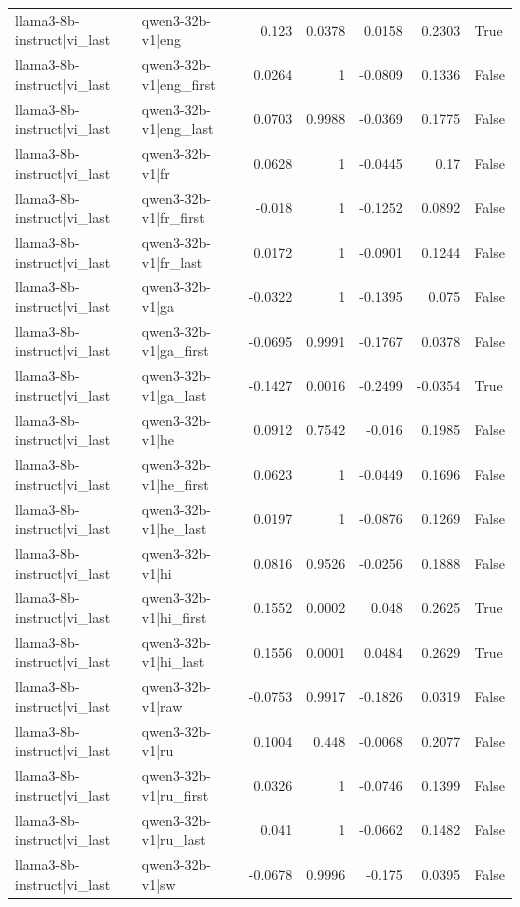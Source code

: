 \begin{table}
\begin{tabular}{l l r r r r l}
llama3-8b-instruct|vi_last & qwen3-32b-v1|eng & 0.123 & 0.0378 & 0.0158 & 0.2303 & True \\
llama3-8b-instruct|vi_last & qwen3-32b-v1|eng_first & 0.0264 & 1 & -0.0809 & 0.1336 & False \\
llama3-8b-instruct|vi_last & qwen3-32b-v1|eng_last & 0.0703 & 0.9988 & -0.0369 & 0.1775 & False \\
llama3-8b-instruct|vi_last & qwen3-32b-v1|fr & 0.0628 & 1 & -0.0445 & 0.17 & False \\
llama3-8b-instruct|vi_last & qwen3-32b-v1|fr_first & -0.018 & 1 & -0.1252 & 0.0892 & False \\
llama3-8b-instruct|vi_last & qwen3-32b-v1|fr_last & 0.0172 & 1 & -0.0901 & 0.1244 & False \\
llama3-8b-instruct|vi_last & qwen3-32b-v1|ga & -0.0322 & 1 & -0.1395 & 0.075 & False \\
llama3-8b-instruct|vi_last & qwen3-32b-v1|ga_first & -0.0695 & 0.9991 & -0.1767 & 0.0378 & False \\
llama3-8b-instruct|vi_last & qwen3-32b-v1|ga_last & -0.1427 & 0.0016 & -0.2499 & -0.0354 & True \\
llama3-8b-instruct|vi_last & qwen3-32b-v1|he & 0.0912 & 0.7542 & -0.016 & 0.1985 & False \\
llama3-8b-instruct|vi_last & qwen3-32b-v1|he_first & 0.0623 & 1 & -0.0449 & 0.1696 & False \\
llama3-8b-instruct|vi_last & qwen3-32b-v1|he_last & 0.0197 & 1 & -0.0876 & 0.1269 & False \\
llama3-8b-instruct|vi_last & qwen3-32b-v1|hi & 0.0816 & 0.9526 & -0.0256 & 0.1888 & False \\
llama3-8b-instruct|vi_last & qwen3-32b-v1|hi_first & 0.1552 & 0.0002 & 0.048 & 0.2625 & True \\
llama3-8b-instruct|vi_last & qwen3-32b-v1|hi_last & 0.1556 & 0.0001 & 0.0484 & 0.2629 & True \\
llama3-8b-instruct|vi_last & qwen3-32b-v1|raw & -0.0753 & 0.9917 & -0.1826 & 0.0319 & False \\
llama3-8b-instruct|vi_last & qwen3-32b-v1|ru & 0.1004 & 0.448 & -0.0068 & 0.2077 & False \\
llama3-8b-instruct|vi_last & qwen3-32b-v1|ru_first & 0.0326 & 1 & -0.0746 & 0.1399 & False \\
llama3-8b-instruct|vi_last & qwen3-32b-v1|ru_last & 0.041 & 1 & -0.0662 & 0.1482 & False \\
llama3-8b-instruct|vi_last & qwen3-32b-v1|sw & -0.0678 & 0.9996 & -0.175 & 0.0395 & False \\

\end{tabular}
\end{table}
